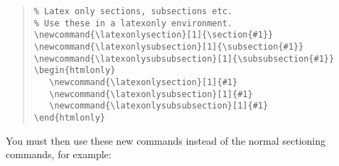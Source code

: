 \documentclass[twoside,11pt]{article}
\newenvironment{latexonly}{}{}
\renewcommand{\_}{\texttt{\symbol{95}}}
\begin{document}
\begin{latexonly}
\begin{quote}
\begin{verbatim}
% Latex only sections, subsections etc.
% Use these in a latexonly environment.
\newcommand{\latexonlysection}[1]{\section{#1}}
\newcommand{\latexonlysubsection}[1]{\subsection{#1}}
\newcommand{\latexonlysubsubsection}[1]{\subsubsection{#1}}
\begin{htmlonly}
   \newcommand{\latexonlysection}[1]{#1}
   \newcommand{\latexonlysubsection}[1]{#1}
   \newcommand{\latexonlysubsubsection}[1]{#1}
\end{htmlonly}
\end{verbatim}
\end{quote}
\end{latexonly}

You must then use these new commands instead of the normal sectioning
commands, for example:
\end{document}
